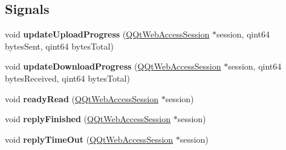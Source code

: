 \subsection*{Signals}
\begin{DoxyCompactItemize}
\item 
\mbox{\label{class_q_qt_web_access_manager_ad4712c69fd2cb009924030b28b02afe0}} 
void {\bfseries update\+Upload\+Progress} (\mbox{\hyperlink{class_q_qt_web_access_session}{Q\+Qt\+Web\+Access\+Session}} $\ast$session, qint64 bytes\+Sent, qint64 bytes\+Total)
\item 
\mbox{\label{class_q_qt_web_access_manager_a3709b5a678b79094faa1817f516b585c}} 
void {\bfseries update\+Download\+Progress} (\mbox{\hyperlink{class_q_qt_web_access_session}{Q\+Qt\+Web\+Access\+Session}} $\ast$session, qint64 bytes\+Received, qint64 bytes\+Total)
\item 
\mbox{\label{class_q_qt_web_access_manager_ab1d6bde2be64103f162476f04e4ad425}} 
void {\bfseries ready\+Read} (\mbox{\hyperlink{class_q_qt_web_access_session}{Q\+Qt\+Web\+Access\+Session}} $\ast$session)
\item 
\mbox{\label{class_q_qt_web_access_manager_ab4d2c7905bbe15082726284c344eded3}} 
void {\bfseries reply\+Finished} (\mbox{\hyperlink{class_q_qt_web_access_session}{Q\+Qt\+Web\+Access\+Session}} $\ast$session)
\item 
\mbox{\label{class_q_qt_web_access_manager_a543e9b8730ee15099a2da48e4ece9443}} 
void {\bfseries reply\+Time\+Out} (\mbox{\hyperlink{class_q_qt_web_access_session}{Q\+Qt\+Web\+Access\+Session}} $\ast$session)
\end{DoxyCompactItemize}
